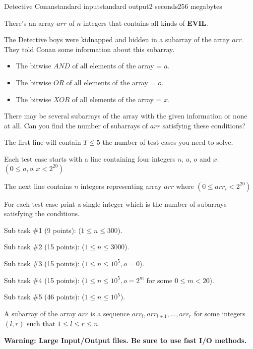 \begin{problem}{Detective Conan}{standard input}{standard output}{2 seconds}{256 megabytes}

There's an array $arr$ of $n$ integers that contains all kinds of \textbf{EVIL}.

The Detective boys were kidnapped and hidden in a subarray of the array $arr$. They told Conan some information about this subarray.

\begin{itemize}
\item The bitwise $AND$ of all elements of the array = $a$.
\item The bitwise $OR$ of all elements of the array = $o$.
\item The bitwise $XOR$ of all elements of the array = $x$.
\end{itemize}

There may be several subarrays of the array with the given information or none at all. Can you find the number of subarrays of $arr$ satisfying these conditions?

\InputFile
The first line will contain $T \le 5$ the number of test cases you need to solve.

Each test case starts with a line containing four integers $n$, $a$, $o$ and $x$. $(0 \le a , o , x < 2^{20})$

The next line contains $n$ integers representing array $arr$ where $(0 \leq arr_i < 2^{20})$


\OutputFile
For each test case print a single integer which is the number of subarrays satisfying the conditions.

\Scoring
Sub task \#1 (9 points): ($1 \leq n \leq 300$).

Sub task \#2 (15 points): ($1 \leq n \leq 3000$).

Sub task \#3 (15 points): ($1 \leq n \leq 10^5 , o=0$).

Sub task \#4 (15 points): ($1 \leq n \leq 10^5 , o=2^m$ for some $0\le m < 20$).

Sub task \#5 (46 points): ($1 \leq n \leq 10^5$).

\Example

\begin{example}
%
\end{example}

\Note
A subarray of the array $arr$ is a sequence $arr_l,  arr_{l  +  1},  ...,  arr_{r}$ for some integers $(l,  r)$ such that $1  \le  l  \le  r  \le  n$.

\textbf{Warning: Large Input/Output files. Be sure to use fast I/O methods.}

\end{problem}

